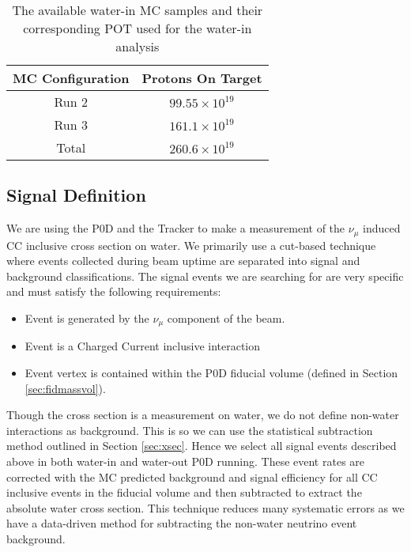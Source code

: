 \begin{table}[h]
\centering
\caption{The available water-in MC samples and their corresponding 
POT used for the water-in analysis}
\begin{tabular}{cc} \toprule
MC Configuration & Protons On Target \\
\hline
Run 2 & $99.55 \times 10^{19}$ \\ 
Run 3 & $161.1 \times 10^{19}$ \\ 
\hline
Total & $260.6 \times 10^{19}$ \\ 
\bottomrule
\end{tabular} 
\label{tab:MCSamplesRun1Run2Run4air} %
\end{table}

\subsection{Signal Definition}
\label{sec:SignalDefinition}

We are using the P0D and the Tracker to make a measurement of the $\nu_\mu$ induced CC inclusive cross section on water. We primarily use a cut-based technique where events collected during beam uptime are separated into signal and background classifications. The signal events we are searching for are very specific and must satisfy the following requirements:

\begin{itemize}
\item Event is generated by the $\nu_\mu$ component of the beam.
\item Event is a Charged Current inclusive interaction
\item Event vertex is contained within the P0D fiducial volume (defined in Section \ref{sec:fidmassvol}).
\end{itemize}

Though the cross section is a measurement on water, we do not define non-water interactions as background. This is so we can use the statistical subtraction method outlined in Section \ref{sec:xsec}. Hence we select all signal events described above in both water-in and water-out P0D running. These event rates are corrected with the MC predicted background and signal efficiency for all CC inclusive events in the fiducial volume and then subtracted to extract the absolute water cross section. This technique reduces many systematic errors as we have a data-driven method for subtracting the non-water neutrino event background.

